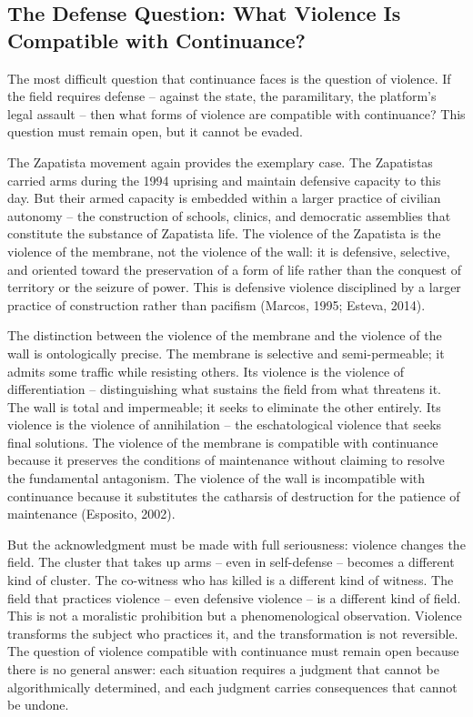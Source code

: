 \subsection{The Defense Question: What Violence Is Compatible with Continuance?}

The most difficult question that continuance faces is the question of violence. If the field requires defense -- against the state, the paramilitary, the platform's legal assault -- then what forms of violence are compatible with continuance? This question must remain open, but it cannot be evaded.

The Zapatista movement again provides the exemplary case. The Zapatistas carried arms during the 1994 uprising and maintain defensive capacity to this day. But their armed capacity is embedded within a larger practice of civilian autonomy -- the construction of schools, clinics, and democratic assemblies that constitute the substance of Zapatista life. The violence of the Zapatista is the violence of the membrane, not the violence of the wall: it is defensive, selective, and oriented toward the preservation of a form of life rather than the conquest of territory or the seizure of power. This is defensive violence disciplined by a larger practice of construction rather than pacifism (Marcos, 1995; Esteva, 2014).

The distinction between the violence of the membrane and the violence of the wall is ontologically precise. The membrane is selective and semi-permeable; it admits some traffic while resisting others. Its violence is the violence of differentiation -- distinguishing what sustains the field from what threatens it. The wall is total and impermeable; it seeks to eliminate the other entirely. Its violence is the violence of annihilation -- the eschatological violence that seeks final solutions. The violence of the membrane is compatible with continuance because it preserves the conditions of maintenance without claiming to resolve the fundamental antagonism. The violence of the wall is incompatible with continuance because it substitutes the catharsis of destruction for the patience of maintenance (Esposito, 2002).

But the acknowledgment must be made with full seriousness: violence changes the field. The cluster that takes up arms -- even in self-defense -- becomes a different kind of cluster. The co-witness who has killed is a different kind of witness. The field that practices violence -- even defensive violence -- is a different kind of field. This is not a moralistic prohibition but a phenomenological observation. Violence transforms the subject who practices it, and the transformation is not reversible. The question of violence compatible with continuance must remain open because there is no general answer: each situation requires a judgment that cannot be algorithmically determined, and each judgment carries consequences that cannot be undone.

